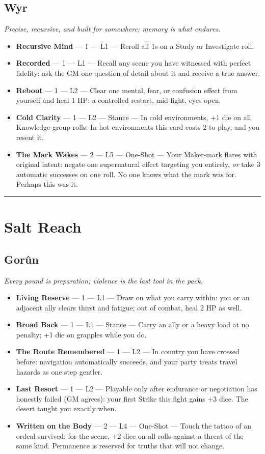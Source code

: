 \subsection{Wyr}
\textit{Precise, recursive, and built for somewhere; memory is what endures.}
\begin{itemize}
    \item \textbf{Recursive Mind} --- 1 --- L1 --- Reroll all 1s on a Study or Investigate roll.
    \item \textbf{Recorded} --- 1 --- L1 --- Recall any scene you have witnessed with perfect fidelity; ask the GM one question of detail about it and receive a true answer.
    \item \textbf{Reboot} --- 1 --- L2 --- Clear one mental, fear, or confusion effect from yourself and heal 1 HP: a controlled restart, mid-fight, eyes open.
    \item \textbf{Cold Clarity} --- 1 --- L2 --- Stance --- In cold environments, +1 die on all Knowledge-group rolls. In hot environments this card costs 2 to play, and you resent it.
    \item \textbf{The Mark Wakes} --- 2 --- L5 --- One-Shot --- Your Maker-mark flares with original intent: negate one supernatural effect targeting you entirely, \textit{or} take 3 automatic successes on one roll. No one knows what the mark was for. Perhaps this was it.
\end{itemize}

\medskip\hrule\medskip

\section{Salt Reach}

\subsection{Gorûn}
\textit{Every pound is preparation; violence is the last tool in the pack.}
\begin{itemize}
    \item \textbf{Living Reserve} --- 1 --- L1 --- Draw on what you carry within: you or an adjacent ally clears thirst and fatigue; out of combat, heal 2 HP as well.
    \item \textbf{Broad Back} --- 1 --- L1 --- Stance --- Carry an ally or a heavy load at no penalty; +1 die on grapples while you do.
    \item \textbf{The Route Remembered} --- 1 --- L2 --- In country you have crossed before: navigation automatically succeeds, and your party treats travel hazards as one step gentler.
    \item \textbf{Last Resort} --- 1 --- L2 --- Playable only after endurance or negotiation has honestly failed (GM agrees): your first Strike this fight gains +3 dice. The desert taught you exactly when.
    \item \textbf{Written on the Body} --- 2 --- L4 --- One-Shot --- Touch the tattoo of an ordeal survived: for the scene, +2 dice on all rolls against a threat of the same kind. Permanence is reserved for truths that will not change.
\end{itemize}

